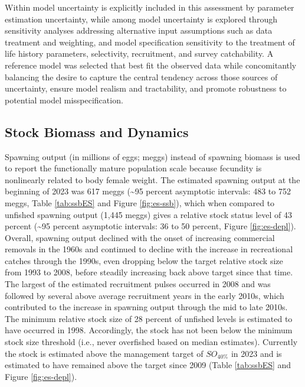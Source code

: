 \documentclass[11pt,
  english,
  letterpaper,
]{article}
\begin{document}
Within model uncertainty is explicitly included in this assessment by parameter estimation uncertainty, while among model uncertainty is explored through sensitivity analyses addressing alternative input assumptions such as data treatment and weighting, and model specification sensitivity to the treatment of life history parameters, selectivity, recruitment, and survey catchability. A reference model was selected that best fit the observed data while concomitantly balancing the desire to capture the central tendency across those sources of uncertainty, ensure model realism and tractability, and promote robustness to potential model misspecification.

\hypertarget{stock-biomass-and-dynamics}{%
\subsection*{Stock Biomass and Dynamics}\label{stock-biomass-and-dynamics}}

Spawning output (in millions of eggs; meggs) instead of spawning biomass is used to report the functionally mature population scale because fecundity is nonlinearly related to body female weight. The estimated spawning output at the beginning of 2023 was 617 meggs (\textasciitilde95 percent asymptotic intervals: 483 to 752 meggs, Table \ref{tab:ssbES} and Figure \ref{fig:es-ssb}), which when compared to unfished spawning output (1,445 meggs) gives a relative stock status level of 43 percent (\textasciitilde95 percent asymptotic intervals: 36 to 50 percent, Figure \ref{fig:es-depl}). Overall, spawning output declined with the onset of increasing commercial removals in the 1960s and continued to decline with the increase in recreational catches through the 1990s, even dropping below the target relative stock size from 1993 to 2008, before steadily increasing back above target since that time. The largest of the estimated recruitment pulses occurred in 2008 and was followed by several above average recruitment years in the early 2010s, which contributed to the increase in spawning output through the mid to late 2010s. The minimum relative stock size of 28 percent of unfished levels is estimated to have occurred in 1998. Accordingly, the stock has not been below the minimum stock size threshold (i.e., never overfished based on median estimates). Currently the stock is estimated above the management target of \(SO_{40\%}\) in 2023 and is estimated to have remained above the target since 2009 (Table \ref{tab:ssbES} and Figure \ref{fig:es-depl}).
\end{document}
